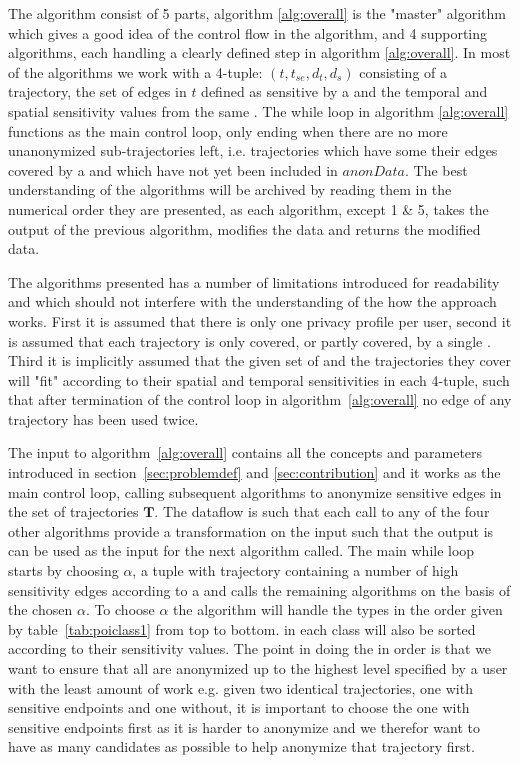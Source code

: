 The algorithm consist of 5 parts, algorithm \ref{alg:overall} is the "master" algorithm which gives a good idea of the control flow in the algorithm, and 4 supporting algorithms, each handling a clearly defined step in algorithm \ref{alg:overall}. In most of the algorithms we work with a 4-tuple: $(t, t_{se}, d_{t}, d_{s})$ consisting of a trajectory, the set of edges in \(t\) defined as sensitive by a \poi and the temporal and spatial sensitivity values from the same \poins. The while loop in algorithm \ref{alg:overall} functions as the main control loop, only ending when there are no more unanonymized sub-trajectories left, i.e. trajectories which have some their edges covered by a \poi and which have not yet been included in $anonData$.
The best understanding of the algorithms will be archived by reading them in the numerical order they are presented, as each algorithm, except 1 \& 5, takes the output of the previous algorithm, modifies the data and returns the modified data.

The algorithms presented has a number of limitations introduced for readability and which should not interfere with the understanding of the how the approach works. First it is assumed that there is only one privacy profile per user, second it is assumed that each trajectory is only covered, or partly covered, by a single \poins. Third it is implicitly assumed that the given set of \pois and the trajectories they cover will "fit" according to their spatial and temporal sensitivities in each 4-tuple, such that after termination of the control loop in algorithm~\ref{alg:overall} no edge of any trajectory has been used twice.




The input to algorithm~\ref{alg:overall} contains all the concepts and parameters introduced in section~\ref{sec:problemdef} and \ref{sec:contribution} and it works as the main control loop, calling subsequent algorithms to anonymize sensitive edges in the set of trajectories \(\mathbf{T}\). The dataflow is such that each call to any of the four other algorithms provide a transformation on the input such that the output is can be used as the input for the next algorithm called.
The main while loop starts by choosing \(\alpha\), a tuple with trajectory containing a number of high sensitivity edges according to a \poi and calls the remaining algorithms on the basis of the chosen \(\alpha\). To choose \(\alpha\) the algorithm will handle the \poi types in the order given by table~\ref{tab:poiclass1} from top to bottom. \pois in each class will also be sorted according to their sensitivity values. The point in doing the \pois in order is that we want to ensure that all \poi are anonymized up to the highest level specified by a user with the least amount of work e.g. given two identical trajectories, one with sensitive endpoints and one without, it is important to choose the one with sensitive endpoints first as it is harder to anonymize and we therefor want to have as many candidates as possible to help anonymize that trajectory first.

